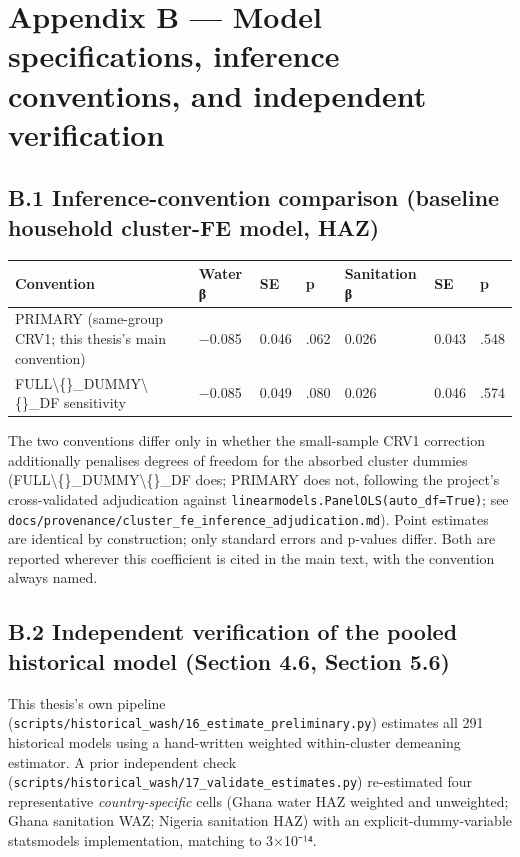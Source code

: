 \section*{Appendix B --- Model specifications, inference conventions, and independent verification}

\subsection*{B.1 Inference-convention comparison (baseline household cluster-FE model, HAZ)}

\begingroup\fontsize{10}{15}\selectfont
\begin{longtable}{lllllll}
\toprule
Convention & Water β & SE & p & Sanitation β & SE & p \\
\midrule
\endhead
PRIMARY (same-group CRV1; this thesis's main convention) & −0.085 & 0.046 & .062 & 0.026 & 0.043 & .548 \\
FULL\textbackslash\{\}\_DUMMY\textbackslash\{\}\_DF sensitivity & −0.085 & 0.049 & .080 & 0.026 & 0.046 & .574 \\
\bottomrule
\end{longtable}
\endgroup

The two conventions differ only in whether the small-sample CRV1 correction additionally penalises degrees of freedom for the absorbed cluster dummies (FULL\textbackslash\{\}\_DUMMY\textbackslash\{\}\_DF does; PRIMARY does not, following the project's cross-validated adjudication against \texttt{linearmodels.PanelOLS(auto\_df=True)}; see \texttt{docs/provenance/cluster\_fe\_inference\_adjudication.md}). Point estimates are identical by construction; only standard errors and p-values differ. Both are reported wherever this coefficient is cited in the main text, with the convention always named.

\subsection*{B.2 Independent verification of the pooled historical model (Section 4.6, Section 5.6)}

This thesis's own pipeline (\texttt{scripts/historical\_wash/16\_estimate\_preliminary.py}) estimates all 291 historical models using a hand-written weighted within-cluster demeaning estimator. A prior independent check (\texttt{scripts/historical\_wash/17\_validate\_estimates.py}) re-estimated four representative \textit{country-specific} cells (Ghana water HAZ weighted and unweighted; Ghana sanitation WAZ; Nigeria sanitation HAZ) with an explicit-dummy-variable statsmodels implementation, matching to 3×10⁻¹⁴.

